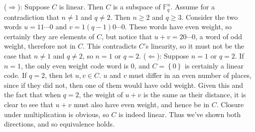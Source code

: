 \documentclass[11pt]{article}
\def\F{\mathbb{F}}
\begin{document}
\section{} %
($\Longrightarrow$):
Suppose $C$ is linear.
Then $C$ is a subspace of $\F_q^n$.
Assume for a contradiction that $n\neq1$ and $q\neq2$.
Then $n\ge2$ and $q\ge3$.
Consider the two words $u=11\cdots0$ and $v=1(q-1)0\cdots0$.
These words have even weight, so certainly they are elements of $C$, but notice that $u+v=20\cdots0$, a word of odd weight, therefore not in $C$.
This contradicts $C$'s linearity, so it must not be the case that $n\neq1$ and $q\neq2$, so $n=1$ or $q=2$.
\newline
\newline
($\Longleftarrow$):
Suppose $n=1$ or $q=2$.
If $n=1$, the only even weight code word is 0, and $C=\left\{0\right\}$ is certainly a linear code.
If $q=2$, then let $u,v\in C$.
$u$ and $v$ must differ in an even number of places, since if they did not, then one of them would have odd weight.
Given this and the fact that when $q=2$, the weight of $u+v$ is the same as their distance, it is clear to see that $u+v$ must also have even weight, and hence be in $C$.
Closure under multiplication is obvious, so $C$ is indeed linear.
\newline
\newline
Thus we've shown both directions, and so equivalence holds.


\section{} %
\end{document}
